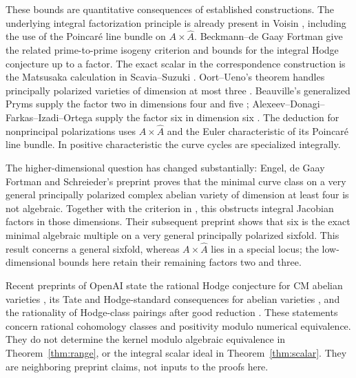 \documentclass[11pt]{article}
\theoremstyle{definition}
\theoremstyle{remark}
\begin{document}
These bounds are quantitative consequences of established constructions. The underlying integral factorization principle is already present in Voisin \cite[Proposition~2.1 and Corollary~2.5]{Voisin}, including the use of the Poincar\'e line bundle on $A\times\widehat A$. Beckmann--de Gaay Fortman \cite[Proposition~4.6 and Theorem~5.3]{Beckmann} give the related prime-to-prime isogeny criterion and bounds for the integral Hodge conjecture up to a factor. The exact scalar in the correspondence construction is the Matsusaka calculation in Scavia--Suzuki \cite[Proposition~3.4, equations~(3.1)--(3.3)]{ScaviaSuzuki}. Oort--Ueno's theorem handles principally polarized varieties of dimension at most three \cite[Theorem~4, p.~2 of the preprint]{OortUeno}. Beauville's generalized Pryms supply the factor two in dimensions four and five \cite[Proposition~2.2, Theorems~5.4 and~6.5(i)]{Beauville}; Alexeev--Donagi--Farkas--Izadi--Ortega supply the factor six in dimension six \cite[Corollary~2, p.~165]{ADFIO}. The deduction for nonprincipal polarizations uses $A\times\widehat A$ and the Euler characteristic of its Poincar\'e line bundle. In positive characteristic the curve cycles are specialized integrally.

The higher-dimensional question has changed substantially: Engel, de Gaay Fortman and Schreieder's preprint \cite[Theorem~1.1 and Corollary~1.5]{Engel} proves that the minimal curve class on a very general principally polarized complex abelian variety of dimension at least four is not algebraic. Together with the criterion in \cite{ScaviaSuzuki}, this obstructs integral Jacobian factors in those dimensions. Their subsequent preprint \cite[Theorem~1.2]{EngelSix} shows that six is the exact minimal algebraic multiple on a very general principally polarized sixfold. This result concerns a general sixfold, whereas $A\times\widehat A$ lies in a special locus; the low-dimensional bounds here retain their remaining factors two and three.

Recent preprints of OpenAI state the rational Hodge conjecture for CM abelian varieties \cite[Theorem~1.1, p.~1]{OpenAICM}, its Tate and Hodge-standard consequences for abelian varieties \cite[Corollaries~8.3--8.4, pp.~49--50]{OpenAICM}, and the rationality of Hodge-class pairings after good reduction \cite[Theorem~1.1, p.~1]{OpenAIRationality}. These statements concern rational cohomology classes and positivity modulo numerical equivalence. They do not determine the kernel modulo algebraic equivalence in Theorem~\ref{thm:range}, or the integral scalar ideal in Theorem~\ref{thm:scalar}. They are neighboring preprint claims, not inputs to the proofs here.
\end{document}
